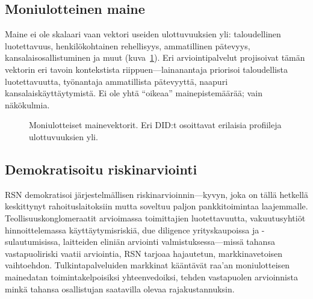 \documentclass[11pt,a4paper,twocolumn]{article}
\begin{document}
\subsection{Moniulotteinen maine}

Maine ei ole skalaari vaan vektori useiden ulottuvuuksien yli: taloudellinen luotettavuus, henkilökohtainen rehellisyys, ammatillinen pätevyys, kansalaisosallistuminen ja muut (kuva~\ref{fig:reputation-radar}). Eri arviointipalvelut projisoivat tämän vektorin eri tavoin kontekstista riippuen---lainanantaja priorisoi taloudellista luotettavuutta, työnantaja ammatillista pätevyyttä, naapuri kansalaiskäyttäytymistä. Ei ole yhtä ``oikeaa'' mainepistemäärää; vain näkökulmia.

\begin{figure}[ht]
\centering
{}
\caption{Moniulotteiset mainevektorit. Eri DID:t osoittavat erilaisia profiileja ulottuvuuksien yli.}
\label{fig:reputation-radar}
\end{figure}

\subsection{Demokratisoitu riskinarviointi}

RSN demokratisoi järjestelmällisen riskinarvioinnin---kyvyn, joka on tällä hetkellä keskittynyt rahoituslaitoksiin mutta soveltuu paljon pankkitoimintaa laajemmalle. Teollisuuskonglomeraatit arvioimassa toimittajien luotettavuutta, vakuutusyhtiöt hinnoittelemassa käyttäytymisriskiä, due diligence yrityskaupoissa ja -sulautumisissa, laitteiden eliniän arviointi valmistuksessa---missä tahansa vastapuoliriski vaatii arviointia, RSN tarjoaa hajautetun, markkinavetoisen vaihtoehdon. Tulkintapalveluiden markkinat kääntävät raa'an moniulotteisen mainedatan toimintakelpoisiksi yhteenvedoiksi, tehden vastapuolen arvioinnista minkä tahansa osallistujan saatavilla olevaa rajakustannuksin.
\end{document}
